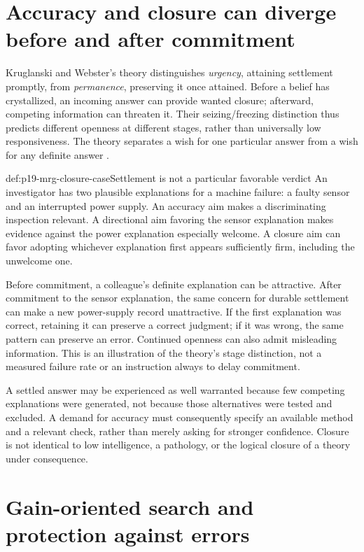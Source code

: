\section{Accuracy and closure can diverge before and after commitment}
\label{sec:p19-mrg-closure}

Kruglanski and Webster's theory distinguishes \emph{urgency}, attaining
settlement promptly, from \emph{permanence}, preserving it once attained.
Before a belief has crystallized, an incoming answer can provide wanted
closure; afterward, competing information can threaten it. Their
seizing/freezing distinction thus predicts different openness
at different stages, rather than universally low responsiveness.
The theory separates a wish for one particular answer from a wish for
any definite answer \cite[pp.~263--267]{KruglanskiWebster1996ClosureMRG}.

\begin{hbexample}{def:p19-mrg-closure-case}{Settlement is not a particular favorable verdict}
An investigator has two plausible explanations for a machine failure:
a faulty sensor and an interrupted power supply. An accuracy aim makes a
discriminating inspection relevant. A directional aim favoring the sensor
explanation makes evidence against the power explanation especially welcome.
A closure aim can favor adopting whichever explanation first appears
sufficiently firm, including the unwelcome one.

Before commitment, a colleague's definite explanation can be attractive.
After commitment to the sensor explanation, the same concern for durable
settlement can make a new power-supply record unattractive. If the first
explanation was correct, retaining it can preserve a correct judgment; if it
was wrong, the same pattern can preserve an error. Continued openness can
also admit misleading information. This is an illustration of the theory's
stage distinction, not a measured failure rate or an instruction always to
delay commitment.
\end{hbexample}

A settled answer may be experienced as well warranted because few competing
explanations were generated, not because those alternatives were tested and
excluded. A demand for accuracy must consequently specify an available
method and a relevant check, rather than merely asking for stronger
confidence. Closure is not identical to low intelligence, a pathology, or
the logical closure of a theory under consequence.

\section{Gain-oriented search and protection against errors}
\label{sec:p19-mrg-strategies}

